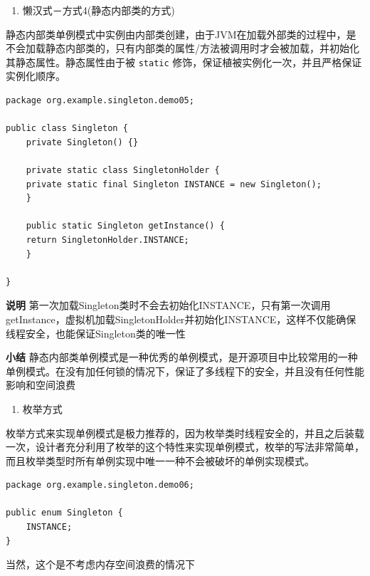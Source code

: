 \documentclass[11pt]{article}
\begin{document}
\begin{enumerate}
\item 懒汉式－方式4(静态内部类的方式)
\end{enumerate}
静态内部类单例模式中实例由内部类创建，由于JVM在加载外部类的过程中，是不会加载静态内部类的，只有内部类的属性/方法被调用时才会被加载，并初始化其静态属性。静态属性由于被 \texttt{static} 修饰，保证植被实例化一次，并且严格保证实例化顺序。
\begin{verbatim}
package org.example.singleton.demo05;

public class Singleton {
    private Singleton() {}

    private static class SingletonHolder {
	private static final Singleton INSTANCE = new Singleton();
    }

    public static Singleton getInstance() {
	return SingletonHolder.INSTANCE;
    }

}
\end{verbatim}

\textbf{说明}
第一次加载Singleton类时不会去初始化INSTANCE，只有第一次调用getInstance，虚拟机加载SingletonHolder并初始化INSTANCE，这样不仅能确保线程安全，也能保证Singleton类的唯一性

\textbf{小结}
静态内部类单例模式是一种优秀的单例模式，是开源项目中比较常用的一种单例模式。在没有加任何锁的情况下，保证了多线程下的安全，并且没有任何性能影响和空间浪费


\begin{enumerate}
\item 枚举方式
\end{enumerate}
枚举方式来实现单例模式是极力推荐的，因为枚举类时线程安全的，并且之后装载一次，设计者充分利用了枚举的这个特性来实现单例模式，枚举的写法非常简单，而且枚举类型时所有单例实现中唯一一种不会被破坏的单例实现模式。
\begin{verbatim}
package org.example.singleton.demo06;

public enum Singleton {
    INSTANCE;
}

\end{verbatim}

当然，这个是不考虑内存空间浪费的情况下
\end{document}
